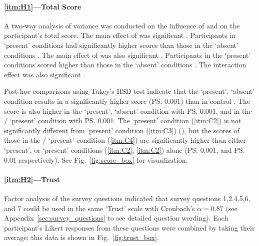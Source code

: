 \paragraph{\ref{itm:H1}---Total Score}
A two-way analysis of variance was conducted on the influence of \xQ{} and \xO{} on the participant's total score. The main effect of \xQ{} was significant . Participants in \xQ{} `present' conditions had significantly higher scores  than those in the \xQ{} `absent' conditions . The main effect of \xO{} was also significant . Participants in the \xO{} `present' conditions scored higher  than those in the \xO{} `absent' conditions . The interaction effect was also significant .

Post-hoc comparisons using Tukey's HSD test indicate that the \xQ{} `present', \xO{} `absent' condition  results in a significantly higher score (\ps{0.001}) than in control . The score is also higher  in the \xO{} `present', \xQ{} `absent' condition  with \ps{0.001}, and in the \xQ/\xO{} `present' condition  with \ps{0.001}. The \xQ{} `present' condition (\ref{itm:C2}) is not significantly different from \xO{} `present' condition (\ref{itm:C3}) (\pns), but the scores of those in the \xQ/\xO{} `present' condition (\ref{itm:C4}) are significantly higher than either \xQ{} `present', or \xO{} `present' conditions (\ref{itm:C2}, \ref{itm:C2}) alone (\ps{0.001}, and \ps{0.01} respectively). See Fig.~\ref{fig:score_box} for visualization.

\paragraph{\ref{itm:H2}---Trust}
Factor analysis of the survey questions indicated that survey questions 1,2,4,5,6, and 7 could be used in the same `Trust' scale with Cronbach's $\alpha = 0.87$ (see Appendix~\ref{sec:survey_questions} to see detailed question wording). Each participant's Likert responses from these questions were combined by taking their average; this data is shown in Fig.~\ref{fig:trust_box}.

